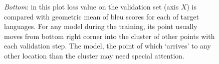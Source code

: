 \begin{figure}[h]
{		\emph{Bottom}: in this plot loss value on the validation set (axis $X$)
		is compared with geometric mean of \acrshort{bleu} scores
		for each of target languages.
		For any model during the training, its point usually moves from
		bottom right corner into the cluster of other points with each validation step.
		The model, the point of which `arrives' to any other location than
		the cluster may need special attention.
	}
	\label{fig:inspect-convergence}
\end{figure}


\cleardoublepage
